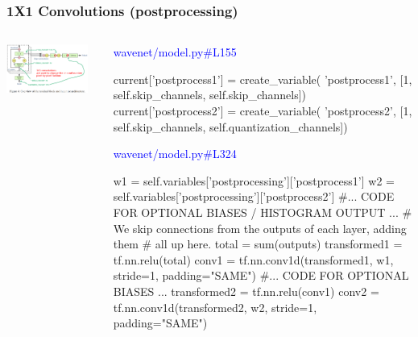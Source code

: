 \documentclass[8pt]{beamer}
\begin{document}
\begin{frame}[fragile]
\frametitle{1X1 Convolutions (postprocessing)}
\begin{columns}
\begin{column}{0.5\textwidth}
 
\includegraphics[width=0.9\textwidth]{./dl3_images/1x1_convolutions_3.png}

\end{column}
\begin{column}{0.5\textwidth}
 
 \textcolor{blue}{wavenet/model.py\#L155}
 
\begin{verbnobox}[\tiny]
    current['postprocess1'] = create_variable(
        'postprocess1',
        [1, self.skip_channels, self.skip_channels])
    current['postprocess2'] = create_variable(
        'postprocess2',
        [1, self.skip_channels, self.quantization_channels])
\end{verbnobox}

 \textcolor{blue}{wavenet/model.py\#L324}
 
 \begin{verbnobox}[\tiny]
    w1 = self.variables['postprocessing']['postprocess1']
    w2 = self.variables['postprocessing']['postprocess2']
        #... CODE FOR OPTIONAL BIASES / HISTOGRAM OUTPUT ...
    # We skip connections from the outputs of each layer, adding them
    # all up here.
    total = sum(outputs)
    transformed1 = tf.nn.relu(total)
    conv1 = tf.nn.conv1d(transformed1, w1, stride=1, padding="SAME")
        #... CODE FOR OPTIONAL BIASES ...
    transformed2 = tf.nn.relu(conv1)
    conv2 = tf.nn.conv1d(transformed2, w2, stride=1, padding="SAME")
\end{verbnobox}

\end{column}
\end{columns} 
 
\end{frame}
\end{document}
